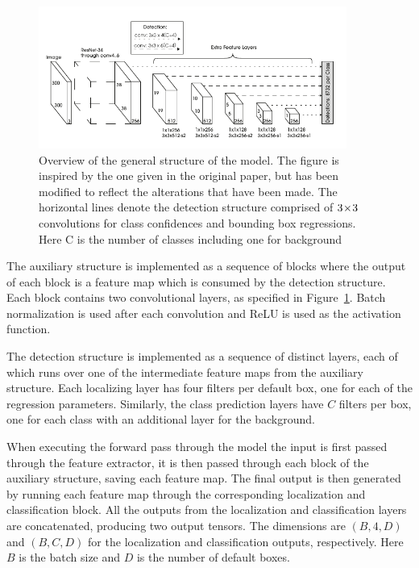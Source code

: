 \begin{figure}[htb]
  \centering
  \includegraphics[width=0.9\textwidth]{figs/method/model.pdf}
  \caption[Model architecture overview]{Overview of the general structure of the model.
The figure is inspired by the one given in the original paper, but has been modified to reflect the alterations that have been made.
The horizontal lines denote the detection structure comprised of \(3\!\times \! 3\) convolutions for class confidences and bounding box regressions.
Here \textsf{C} is the number of classes including one for background}\label{fig:model}
\end{figure}

The auxiliary structure is implemented as a sequence of blocks where the output of each block is a feature map which is consumed by the detection structure.
Each block contains two convolutional layers, as specified in Figure~\ref{fig:model}.
Batch normalization is used after each convolution and ReLU is used as the activation function.

The detection structure is implemented as a sequence of distinct layers, each of which runs over one of the intermediate feature maps from the auxiliary structure.
Each localizing layer has four filters per default box, one for each of the regression parameters.
Similarly, the class prediction layers have \(C\) filters per box, one for each class with an additional layer for the background.

When executing the forward pass through the model the input is first passed through the feature extractor, it is then passed through each block of the auxiliary structure, saving each feature map.
The final output is then generated by running each feature map through the corresponding localization and classification block.
All the outputs from the localization and classification layers are concatenated, producing two output tensors.
The dimensions are \(\left(B,4,D\right) \) and \(\left(B,C,D\right) \) for the localization and classification outputs, respectively.
Here \(B\) is the batch size and \(D\) is the number of default boxes.

